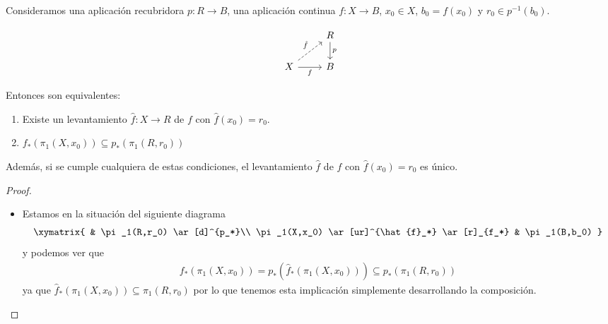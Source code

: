 \begin{teo}
    Consideramos una aplicación recubridora $p:R\to B$, una aplicación continua $f:X\to B$, $x_0\in X$, $b_0=f(x_0)$ y $r_0\in p^{-1}(b_0)$. 
    


    \[
    \begin{tikzcd}
        & R \arrow[d, "p"] \\
        X \arrow[r, "f"'] \arrow[ur, dashed, "\hat{f}"] & B
    \end{tikzcd}
    \]

    Entonces son equivalentes:
    \begin{enumerate}
        \item Existe un levantamiento $\hat{f}:X \to R$ de $f$ con $\hat{f}(x_0)=r_0$.
        \item $f_*(\pi_1(X,x_0))\subseteq p_*(\pi_1(R,r_0))$
    \end{enumerate}
    Además, si se cumple cualquiera de estas condiciones, el levantamiento $\hat{f}$ de $f$ con $\hat{f}(x_0)=r_0$ es único.

    \begin{proof}\
        \begin{itemize}
            \item [(1) $\Rightarrow$ (2)] Estamos en la situación del siguiente diagrama
            \begin{gather*}
                \xymatrix{
                    & \pi_1(R,r_0) \ar[d]^{p_*}\\
                    \pi_1(X,x_0) \ar[ur]^{\hat{f}_*} \ar[r]_{f_*} & \pi_1(B,b_0)
                }
            \end{gather*}
            y podemos ver que 
            \begin{gather*}
                f_*(\pi_1(X,x_0)) = p_*(\hat{f}_*(\pi_1(X,x_0))) \subseteq p_*(\pi_1(R,r_0))
            \end{gather*}
            ya que $\hat{f}_*(\pi_1(X,x_0))\subseteq \pi_1(R,r_0)$ por lo que tenemos esta implicación simplemente desarrollando la composición.


\end{itemize}
\end{proof}
\end{teo}
